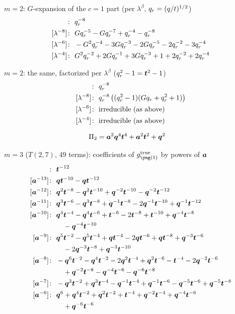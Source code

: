 $m = 2$: $G$-expansion of the $c = 1$ part (per $\lambda^\beta$, $q_r = (q/t)^{1/2}$)
\begin{align*}
[\lambda^{-10}]\colon\ & \qr^{-8} \\
[\lambda^{-8}]\colon\ & G \qr^{-5} -G \qr^{-7} +\qr^{-4} -\qr^{-8} \\
[\lambda^{-6}]\colon\ & -G^{2} \qr^{-4} -3 G \qr^{-3} -2 G \qr^{-5} -2 \qr^{-2} -3 \qr^{-4} \\
[\lambda^{-4}]\colon\ & G^{2} \qr^{-2} +2 G \qr^{-1} +3 G \qr^{-3} +1 +2 \qr^{-2} +2 \qr^{-4}
\end{align*}

$m = 2$: the same, factorized per $\lambda^\beta$ ($q_r^2 - 1 = \bm{t}^2 - 1$)
\begin{align*}
[\lambda^{-10}]\colon\ & \qr^{-8} \\
[\lambda^{-8}]\colon\ & \qr^{-8}\,\bigl((\qr^2 - 1)(G \qr + \qr^{2} + 1)\bigr) \\
[\lambda^{-6}]\colon\ & \text{irreducible (as above)} \\
[\lambda^{-4}]\colon\ & \text{irreducible (as above)}
\end{align*}

\begin{align*}
\Pi_{2} &= \bm{a}^{2} \bm{q}^{4} \bm{t}^{4} +\bm{a}^{2} \bm{t}^{2} +\bm{q}^{2}
\end{align*}

$m = 3$ ($T(2,7)$, 49 terms): coefficients of $g^{\mathrm{true}}_{\yone}$ by powers of $\bm{a}$
\begin{align*}
[\ba^{-14}]\colon\ & \bt^{-12} \\
[\ba^{-13}]\colon\ & \bq \bt^{-10} -\bq \bt^{-12} \\
[\ba^{-12}]\colon\ & \bq^{2} \bt^{-8} -\bq^{2} \bt^{-10} +\bq^{-2} \bt^{-10} -\bq^{-2} \bt^{-12} \\
[\ba^{-11}]\colon\ & \bq^{3} \bt^{-6} -\bq^{3} \bt^{-8} +\bq^{-1} \bt^{-8} -2 \bq^{-1} \bt^{-10} +\bq^{-1} \bt^{-12} \\
[\ba^{-10}]\colon\ & \bq^{4} \bt^{-4} -\bq^{4} \bt^{-6} +\bt^{-6} -2 \bt^{-8} +\bt^{-10} +\bq^{-4} \bt^{-8} \\
& \quad -\bq^{-4} \bt^{-10} \\
[\ba^{-9}]\colon\ & \bq^{5} \bt^{-2} -\bq^{5} \bt^{-4} +\bq \bt^{-4} -2 \bq \bt^{-6} +\bq \bt^{-8} +\bq^{-3} \bt^{-6} \\
& \quad -2 \bq^{-3} \bt^{-8} +\bq^{-3} \bt^{-10} \\
[\ba^{-8}]\colon\ & -\bq^{6} \bt^{-2} -\bq^{4} \bt^{-2} -2 \bq^{2} \bt^{-4} +\bq^{2} \bt^{-6} -\bt^{-4} -2 \bq^{-2} \bt^{-6} \\
& \quad +\bq^{-2} \bt^{-8} -\bq^{-4} \bt^{-6} -\bq^{-6} \bt^{-8} \\
[\ba^{-7}]\colon\ & -\bq^{3} \bt^{-2} +\bq^{3} \bt^{-4} -\bq^{-1} \bt^{-4} +\bq^{-1} \bt^{-6} -\bq^{-5} \bt^{-6} +\bq^{-5} \bt^{-8} \\
[\ba^{-6}]\colon\ & \bq^{6} +\bq^{4} \bt^{-2} +\bq^{2} \bt^{-2} +\bt^{-4} +\bq^{-2} \bt^{-4} +\bq^{-4} \bt^{-6} \\
& \quad +\bq^{-6} \bt^{-6}
\end{align*}

